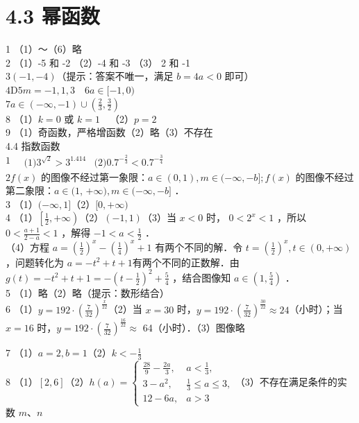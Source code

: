\documentclass[10pt]{article}
\begin{document}
\section*{4.3 幂函数}
1 （1）～（6）略\\
2 （1）-5 和 -2 （2）-4 和 -3 （3） 2 和 -1\\
\(3(-1,-4)\)（提示：答案不唯一，满足 \(b=4 a<0\) 即可）\\
\(4 \mathrm{D} 5 m=-1,1,3 \quad 6 a \in[-1,0)\)\\
\(7 a \in(-\infty,-1) \cup\left(\frac{2}{3}, \frac{3}{2}\right)\)\\
8 （1）\(k=0\) 或 \(k=1 \quad\)（2）\(p=2\)\\
9 （1）奇函数，严格增函数（2）略（3）不存在\\
4.4 指数函数\\
\(1 \quad \begin{array}{ll}\text {(1)} 3^{\sqrt{2}}>3^{1.414} & \text {(2)} 0.7^{-\frac{2}{3}}<0.7^{-\frac{3}{4}}\end{array}\)\\
\(2 f(x)\) 的图像不经过第一象限：\(a \in(0,1), m \in(-\infty,-b] ; f(x)\) 的图像不经过第二象限：\(a \in(1\), \(+\infty), m \in(-\infty,-b]\) ．\\
3 （1）\((-\infty, 1]\)（2）\([0,+\infty)\)\\
4 （1）\(\left[\frac{1}{2},+\infty\right)\)（2）\((-1,1)\)（3）当 \(x<0\) 时， \(0<2^{x}<1\) ，所以 \(0<\frac{a+1}{2-a}<1\) ，解得 \(-1<a<\frac{1}{2}\) ．\\
（4）方程 \(a=\left(\frac{1}{2}\right)^{x}-\left(\frac{1}{4}\right)^{x}+1\) 有两个不同的解．令 \(t=\left(\frac{1}{2}\right)^{x}, t \in(0,+\infty)\) ，问题转化为 \(a=-t^{2}+t+1\)有两个不同的正数解．由 \(g(t)=-t^{2}+t+1=-\left(t-\frac{1}{2}\right)^{2}+\frac{5}{4}\) ，结合图像知 \(a \in\left(1, \frac{5}{4}\right)\) ．\\
5 （1）略（2）略（提示：数形结合）\\
6 （1）\(y=192 \cdot\left(\frac{7}{32}\right)^{\frac{x}{22}}\)（2）当 \(x=30\) 时，\(y=192 \cdot\left(\frac{7}{32}\right)^{\frac{30}{22}} \approx 24\)（小时）；当 \(x=16\) 时，\(y=192 \cdot\left(\frac{7}{32}\right)^{\frac{16}{22}} \approx\) 64（小时）．（3）图像略

7 （1）\(a=2, b=1\)（2）\(k<-\frac{1}{3}\)\\
8 （1）\([2,6]\)（2）\(h(a)=\left\{\begin{array}{ll}\frac{28}{9}-\frac{2 a}{3}, & a<\frac{1}{3}, \\ 3-a^{2}, & \frac{1}{3} \leqslant a \leqslant 3, \\ 12-6 a, & a>3\end{array}\right.\)（3）不存在满足条件的实数 \(m 、 n\)
\end{document}
